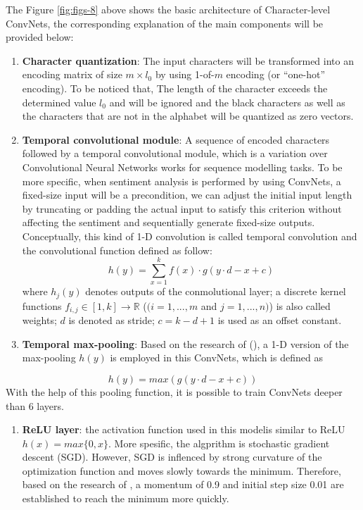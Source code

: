 \documentclass[]{krantz}
\providecommand{\tightlist}{%
  \setlength{\itemsep}{0pt}\setlength{\parskip}{0pt}}
\begin{document}
The Figure \ref{fig:figs-8} above shows the basic architecture of Character-level ConvNets, the corresponding explanation of the main components will be provided below:

\begin{enumerate}
\def\labelenumi{\arabic{enumi}.}
\item
  \textbf{Character quantization}: The input characters will be transformed into an encoding matrix of size \(m \times l_0\) by using 1-of-\(m\) encoding (or ``one-hot'' encoding). To be noticed that, The length of the character exceeds the determined value \(l_0\) and will be ignored and the black characters as well as the characters that are not in the alphabet will be quantized as zero vectors.
\item
  \textbf{Temporal convolutional module}: A sequence of encoded characters followed by a temporal convolutional module, which is a variation over Convolutional Neural Networks works for sequence modelling tasks. To be more specific, when sentiment analysis is performed by using ConvNets, a fixed-size input will be a precondition, we can adjust the initial input length by truncating or padding the actual input to satisfy this criterion without affecting the sentiment and sequentially generate fixed-size outputs. Conceptually, this kind of 1-D convolution is called temporal convolution and the convolutional function defined as follow:
  \[h(y)=\sum_{x=1}^{k}f(x)\cdot g(y \cdot d -x+c)\]
  where \(h_{j}(y)\) denotes outputs of the conmolutional layer; a discrete kernel functions \(f_{i,j} \in [1,k] \to \mathbb{R}\) (\((i=1,...,m\) and \(j=1,...,n)\)) is also called weights; \(d\) is denoted as stride; \(c= k-d+1\) is used as an offset constant.
\item
  \textbf{Temporal max-pooling}: Based on the research of (\citet{Boureau2010ATA}), a 1-D version of the max-pooling \(h(y)\) is employed in this ConvNets, which is defined as
\end{enumerate}

\[h(y)=max (g(y \cdot d -x+c))\]
With the help of this pooling function, it is possible to train ConvNets deeper than 6 layers.

\begin{enumerate}
\def\labelenumi{\arabic{enumi}.}
\setcounter{enumi}{3}
\tightlist
\item
  \textbf{ReLU layer}: the activation function used in this modelis similar to ReLU \(h(x)=max\{0,x\}\). More spesific, the algprithm is stochastic gradient descent (SGD). However, SGD is inflenced by strong curvature of the optimization function and moves slowly towards the minimum. Therefore, based on the research of \citet{Sutskever2013OnTI}, a momentum of 0.9 and initial step size 0.01 are established to reach the minimum more quickly.
\end{enumerate}
\end{document}
